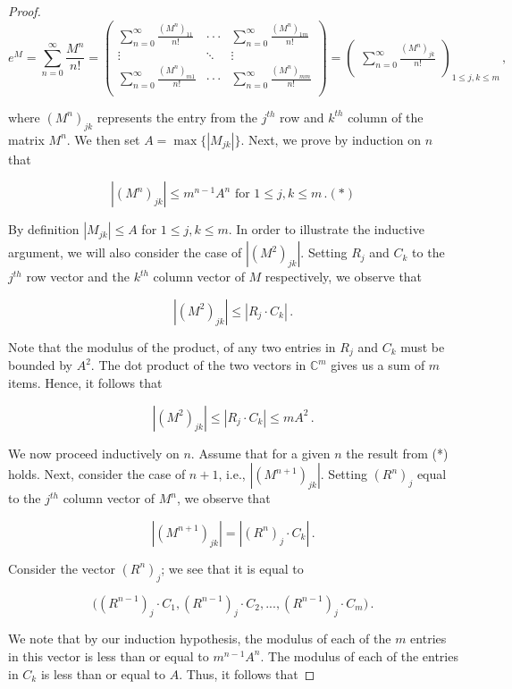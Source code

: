 \documentclass[a4paper]{article}
\newcommand {\m} {\cdot}
\numberwithin{equation}{section}
\begin{document}
\begin{description}
\begin{proof}
$$e^M = \sum_{n=0}^{\infty}\frac{M^n}{n!} = \begin{pmatrix}

\sum_{n=0}^{\infty}\frac{(M^n)_{11}}{n!} & \m\m\m & \sum_{n=0}^{\infty}\frac{(M^n)_{1m}}{n!} \\

\vdots & \ddots & \vdots \\

\sum_{n=0}^{\infty}\frac{(M^n)_{m1}}{n!} & \m\m\m & \sum_{n=0}^{\infty}\frac{(M^n)_{mm}}{n!} \\

\end{pmatrix} = 
\begin{pmatrix}
\sum_{n=0}^{\infty}\frac{(M^n)_{jk}}{n!}\\
\end{pmatrix}_{1\leq j,k \leq m}
\,,$$

where $(M^n)_{jk}$ represents the entry from the $j^{th}$ row and $k^{th}$ column of the matrix $M^n$. We then set $A = \max{\lbrace|M_{jk}|\rbrace}$. Next, we prove by induction on $n$ that 

	$$|(M^n)_{jk}| \leq m^{n-1}A^n \text{ for } 1 \leq j,k \leq m\,.  (*)$$
	
By definition $|M_{jk}| \leq A$ for $1 \leq j,k \leq m$. In order to illustrate the inductive argument, we will also consider the case of $|(M^2)_{jk}|$. Setting $R_j$ and $C_k$ to the $j^{th}$ row vector and the $k^{th}$ column vector of $M$ respectively, we observe that

$$|(M^2)_{jk}| \leq |R_j \m C_k|\,.$$

Note that the modulus of the product, of any two entries in $R_j$ and $C_k$ must be bounded by $A^2$. The dot product of the two vectors in $\mathbb{C}^m$ gives us a sum of $m$ items. Hence, it follows that 

$$|(M^2)_{jk}| \leq |R_j \m C_k| \leq mA^2\,.$$

We now proceed inductively on $n$. Assume that for a given $n$ the result from (*) holds. Next, consider the case of $n+1$, i.e., $|(M^{n+1})_{jk}|$. Setting $(R^n)_{j}$ equal to the $j^{th}$ column vector of $M^n$, we observe that

$$|(M^{n+1})_{jk}| = |(R^n)_j \m C_k|\,.$$

Consider the vector $(R^n)_j$; we see that it is equal to

$$\Big((R^{n-1})_j \m C_1, (R^{n-1})_j \m C_2,...,(R^{n-1})_j \m C_m \Big)\,.$$

We note that by our induction hypothesis, the modulus of each of the $m$ entries in this vector is less than or equal to $m^{n-1}A^n$. The modulus of each of the entries in $C_k$ is less than or equal to $A$. Thus, it follows that 


\end{proof}
\end{description}
\end{document}

